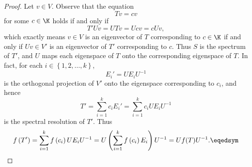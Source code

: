\documentclass[linearalgebraII]{subfiles}
\begin{document}
    \begin{proof}
        Let $v\in V$. Observe that the equation
        \begin{equation*}
            Tv = cv
        \end{equation*}
        for some $c\in\K$ holds if and only if
        \begin{equation*}
            T'Uv = UTv = Ucv = cUv,
        \end{equation*}
        which exactly means $v\in V$ is an eigenvector of $T$ corresponding to $c\in\K$ if and only if $Uv\in V'$ is an eigenvector of $T'$ corresponding to $c$. Thus $S$ is the spectrum of $T'$, and $U$ maps each eigenspace of $T$ onto the corresponding eigenspace of $T$. In fact, for each $i\in\left\lbrace 1,2,\ldots,k \right\rbrace $,
        \begin{equation*}
            E_i' = UE_iU^{-1}
        \end{equation*}
        is the orthogonal projection of $V'$ onto the eigenspace corresponding to $c_i$, and hence
        \begin{equation*}
            T' = \sum^{k}_{i=1} c_iE_i' = \sum^{k}_{i=1} c_iUE_iU^{-1}
        \end{equation*}
        is the spectral resolution of $T'$. Thus
        \begin{equation*}
            f\left( T' \right) = \sum^{k}_{i=1} f\left( c_i \right) UE_iU^{-1} = U \left( \sum^{k}_{i=1} f\left( c_i \right) E_i \right) U^{-1} = Uf(T)U^{-1}.\eqedsym
        \end{equation*}
    \end{proof}
\end{document}
